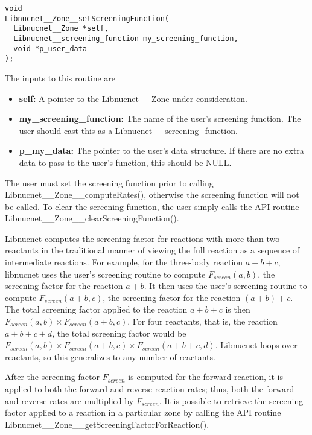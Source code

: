 \documentclass{article}    %
\begin{document}
\begin{verbatim}
void
Libnucnet__Zone__setScreeningFunction(
  Libnucnet__Zone *self,
  Libnucnet__screening_function my_screening_function,
  void *p_user_data
);
\end{verbatim}

The inputs to this routine are
\begin{itemize}

\item {\bf self:}  A pointer to the Libnucnet\_\_Zone under consideration.

\item {\bf my\_screening\_function:}  The name of the user's screening
function.  The user should cast this as a Libnucnet\_\_screening\_function.

\item {\bf p\_my\_data:}  The pointer to the user's data structure.  If there
are no extra data to pass to the user's function, this should be NULL.
\end{itemize}

The user must set the screening function prior to calling
Libnucnet\_\_Zone\_\_computeRates(), otherwise the screening function will
not be called.  To clear the screening function, the user simply calls
the API routine Libnucnet\_\_Zone\_\_clearScreeningFunction().

Libnucnet computes the screening factor for reactions with more than two
reactants in the traditional manner of viewing the full reaction as a sequence
of intermediate reactions.  For example, for the three-body reaction
$a + b + c$, libnucnet uses the user's screening routine to compute
$F_{screen}(a,b)$, the screening factor for the reaction $a + b$.
It then uses the
user's screening routine to compute $F_{screen}(a+b,c)$,
the screening factor for
the reaction $(a + b) + c$.  The total screening factor applied to the
reaction $a + b + c$ is then $F_{screen}(a,b) \times F_{screen}(a+b,c)$.
For four reactants,
that is, the reaction $a + b + c + d$, the total screening factor would
be $F_{screen}(a,b) \times F_{screen}(a+b,c) \times F_{screen}(a+b+c,d)$.
Libnucnet loops over reactants,
so this generalizes to any number of reactants.

After the screening factor $F_{screen}$ is computed for the forward reaction,
it is applied to both the forward and reverse reaction rates; thus, both the
forward and reverse rates are multiplied by $F_{screen}$.
It is possible to retrieve the screening factor applied to a reaction
in a particular zone by calling the API routine
Libnucnet\_\_Zone\_\_getScreeningFactorForReaction().
\end{document}

